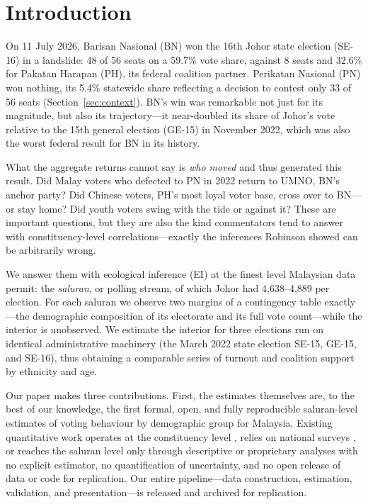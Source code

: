 \documentclass[11pt]{article}
\begin{document}
\section{Introduction}
\label{sec:intro}

On 11 July 2026, Barisan Nasional (BN) won the 16th Johor state election (SE-16) in a landslide: 48 of 56 seats on a 59.7\% vote share, against 8 seats and 32.6\% for Pakatan Harapan (PH), its federal coalition partner. Perikatan Nasional (PN) won nothing, its 5.4\% statewide share reflecting a decision to contest only 33 of 56 seats (Section~\ref{sec:context}). BN's win was remarkable not just for its magnitude, but also its trajectory---it near-doubled its share of Johor's vote relative to the 15th general election (GE-15) in November 2022, which was also the worst federal result for BN in its history.

What the aggregate returns cannot say is \emph{who moved} and thus generated this result. Did Malay voters who defected to PN in 2022 return to UMNO, BN's anchor party? Did Chinese voters, PH's most loyal voter base, cross over to BN---or stay home? Did youth voters swing with the tide or against it? These are important questions, but they are also the kind commentators tend to answer with constituency-level correlations---exactly the inferences Robinson\cite{robinson1950} showed can be arbitrarily wrong.

We answer them with ecological inference (EI) at the finest level Malaysian data permit: the \textit{saluran}, or polling stream, of which Johor had 4,638--4,889 per election. For each saluran we observe two margins of a contingency table exactly---the demographic composition of its electorate and its full vote count---while the interior is unobserved. We estimate the interior for three elections run on identical administrative machinery (the March 2022 state election SE-15, GE-15, and SE-16), thus obtaining a comparable series of turnout and coalition support by ethnicity and age.

Our paper makes three contributions. First, the estimates themselves are, to the best of our knowledge, the first formal, open, and fully reproducible saluran-level estimates of voting behaviour by demographic group for Malaysia. Existing quantitative work operates at the constituency level \cite{pepinsky2015,dettmanpepinsky2024,chen2026}, relies on national surveys \cite{marzukisuffian2023}, or reaches the saluran level only through descriptive or proprietary analyses with no explicit estimator, no quantification of uncertainty, and no open release of data or code for replication\cite{zhanghutchinson2022,welsh2026b}. Our entire pipeline---data construction, estimation, validation, and presentation---is released and archived for replication.
\end{document}
